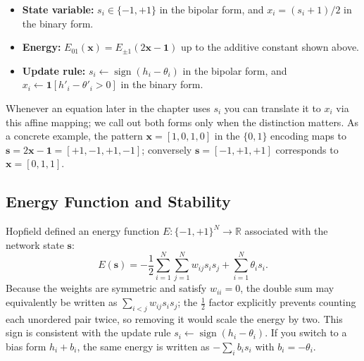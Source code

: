 \begin{tcolorbox}[summarybox, title={Encoding correspondence at a glance}]
\begin{itemize}
    \item \textbf{State variable:} \(s_i \in \{-1,+1\}\) in the bipolar form, and \(x_i=(s_i+1)/2\) in the binary form.
    \item \textbf{Energy:} \(E_{01}(\mathbf{x}) = E_{\pm1}(2\mathbf{x}-\mathbf{1})\) up to the additive constant shown above.
    \item \textbf{Update rule:} \(s_i \leftarrow \operatorname{sign}(h_i-\theta_i)\) in the bipolar form, and \(x_i \leftarrow \mathbf{1}[h'_i-\theta'_i>0]\) in the binary form.
\end{itemize}
\end{tcolorbox}

Whenever an equation later in the chapter uses \(s_i\) you can translate it to \(x_i\) via this affine mapping; we call out both forms only when the distinction matters. As a concrete example, the pattern \(\mathbf{x}=[1,0,1,0]\) in the \(\{0,1\}\) encoding maps to \(\mathbf{s}=2\mathbf{x}-\mathbf{1}=[+1,-1,+1,-1]\); conversely \(\mathbf{s}=[-1,+1,+1]\) corresponds to \(\mathbf{x}=[0,1,1]\).

\subsection{Energy Function and Stability}
\label{sec:hopfield_energy_function_and_stability}

Hopfield defined an energy function \(E: \{-1, +1\}^N \to \mathbb{R}\) associated with the network state \(\mathbf{s}\):
\begin{equation}
    E(\mathbf{s}) = -\frac{1}{2} \sum_{i=1}^N \sum_{j=1}^N w_{ij} s_i s_j + \sum_{i=1}^N \theta_i s_i.
    \label{eq:energy_function}
\end{equation}
Because the weights are symmetric and satisfy \(w_{ii}=0\), the double sum may equivalently be written as \(\sum_{i<j} w_{ij} s_i s_j\); the \(\tfrac{1}{2}\) factor explicitly prevents counting each unordered pair twice, so removing it would scale the energy by two. This sign is consistent with the update rule \(s_i \leftarrow \operatorname{sign}(h_i-\theta_i)\). If you switch to a bias form \(h_i+b_i\), the same energy is written as \(-\sum_i b_i s_i\) with \(b_i=-\theta_i\).

